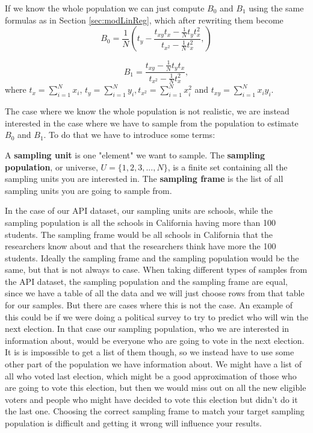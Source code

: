 \documentclass{article}
\begin{document}
If we know the whole population we can just compute \(B_0\) and \(B_1\) using the same formulas
as in Section \ref{sec:modLinReg}, which after rewriting them become
\begin{equation*}
 B_0 = \frac{1}{N} \left( t_y - \frac{t_{xy} t_x - \frac{1}{N} t_y t_x^2}
   {t_{x^2} - \frac{1}{N} t_x^2},
  \right)
\end{equation*}

\begin{equation*}
 B_1 = \frac{t_{xy} - \frac{1}{N} t_y t_x}
   {t_{x^2} - \frac{1}{N} t_x^2},
\end{equation*}
where \(t_x = \sum_{i = 1}^N x_i\), \(t_y = \sum_{i = 1}^N y_i, t_{x^2} =
\sum_{i = 1}^N x_i^2\) and \(t_{xy} =
\sum_{i = 1}^N x_i y_i\).

The case where we know the whole population is not realistic, we are instead interested in the case where we have to sample from the
population to estimate \(B_0\) and \(B_1\). To do that we have to introduce some terms:

\begin{definition} \label{def:sampUnitPopFrame}
 A \textbf{sampling unit} is one "element" we want to sample.
 The \textbf{sampling population}, or universe, \(U = \{1, 2, 3, ..., N\}\), is a
 finite set containing all the sampling units you are interested in. 
 The \textbf{sampling frame} is the list of all sampling units you are going to sample from. 
\end{definition}

In the case of our API dataset, our sampling units are schools, while
the sampling population is all the schools in California having more than 100 students.
The sampling frame would be all schools in California that the researchers know
about and that the researchers think have more the 100 students.
Ideally the sampling frame and the sampling population would be the same, but that is not always to case.
When taking different types of samples from the API dataset, the sampling population and the sampling frame are equal, since
we have a table of all the data and we will just choose rows from that table for
our samples. But there are cases where this is not the case. An example of this
could be if we were doing a political survey to try to predict who will win the
next election.
In that case our sampling population, who we are interested in information
about, would be everyone who are going to vote in the next election. It is
is impossible to get a list of them though, so we instead have to use 
some other part of the population we have information about. We might have a
list of all who voted last election, which might be a good approximation of
those who are going to vote this election, but then we would miss out on all the
new eligible voters and people who might have decided to vote this election but
didn't do it the last one.
Choosing the correct sampling frame to match your target sampling population is
difficult and getting it wrong will influence your results.
\end{document}

